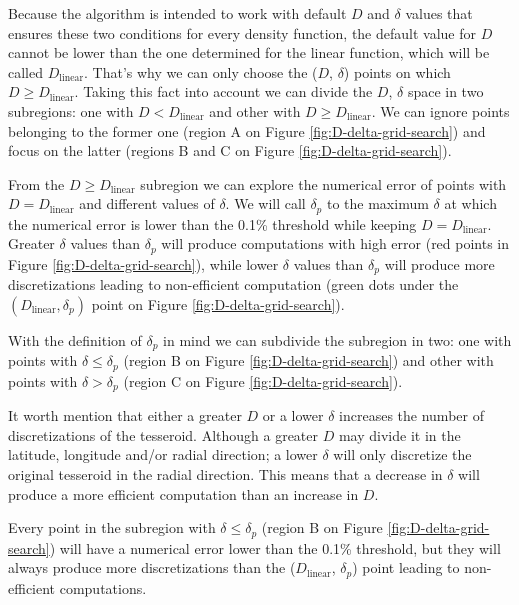 \documentclass[extra]{gji}
\begin{document}
Because the algorithm is intended to work with default $D$ and $\delta$ 
values that ensures these two conditions for every density function, 
the default value for $D$ cannot be lower than the one determined for 
the linear function, which will be called $D_\text{linear}$.
That's why we can only choose the ($D$, $\delta$) points on which
$D \geq D_\text{linear}$.
Taking this fact into account we can divide the $D$, $\delta$ space in 
two subregions: one with $D < D_\text{linear}$ and other with $D \ge 
D_\text{linear}$. We can ignore points belonging to the former one 
(region A on Figure \ref{fig:D-delta-grid-search}) and focus on the 
latter (regions B and C on Figure \ref{fig:D-delta-grid-search}).

From the $D \ge D_\text{linear}$ subregion we can explore the numerical 
error of points with $D = D_\text{linear}$ and different values of 
$\delta$.
We will call $\delta_p$ to the maximum $\delta$ at which the numerical 
error is lower than the 0.1\% threshold while keeping
$D = D_ \text{linear}$.
Greater $\delta$ values than $\delta_p$ will produce computations with 
high error (red points in Figure \ref{fig:D-delta-grid-search}), while 
lower $\delta$ values than $\delta_p$ will produce more discretizations 
leading to non-efficient computation (green dots under the 
$(D_\text{linear}, \delta_p)$ point on Figure \ref{fig:D-delta-grid-search}).

With the definition of $\delta_p$ in mind we can subdivide the 
subregion in two: one with points with $\delta \le \delta_p$ (region B 
on Figure \ref{fig:D-delta-grid-search}) and other with points with 
$\delta > \delta_p$ (region C on Figure \ref{fig:D-delta-grid-search}).

It worth mention that either a greater $D$ or a lower $\delta$ 
increases the number of discretizations of the tesseroid.
Although a greater $D$ may divide it in the latitude, longitude 
and/or radial direction; a lower $\delta$ will only discretize the 
original tesseroid in the radial direction.
This means that a decrease in $\delta$ will produce a more efficient 
computation than an increase in $D$.

Every point in the subregion with $\delta \le \delta_p$ (region B on 
Figure \ref{fig:D-delta-grid-search}) will have a numerical error lower 
than the 0.1\% threshold, but they will always produce more 
discretizations than the ($D_\text{linear}$, $\delta_p$) point leading 
to non-efficient computations.
\end{document}
